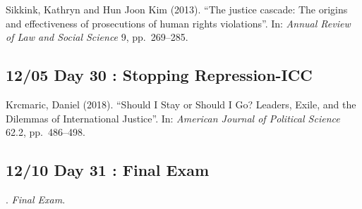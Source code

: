 \documentclass[11pt,]{article}
\begin{document}
Sikkink, Kathryn and Hun Joon Kim (2013). ``The justice cascade: The
origins and effectiveness of prosecutions of human rights violations''.
In: \emph{Annual Review of Law and Social Science} 9, pp.~269--285.

\hypertarget{day-30-stopping-repression-icc}{%
\subsection{12/05 Day 30 : Stopping
Repression-ICC}\label{day-30-stopping-repression-icc}}

Krcmaric, Daniel (2018). ``Should I Stay or Should I Go? Leaders, Exile,
and the Dilemmas of International Justice''. In:
\emph{American Journal of Political Science} 62.2, pp.~486--498.

\hypertarget{day-31-final-exam}{%
\subsection{12/10 Day 31 : Final Exam}\label{day-31-final-exam}}

. \emph{Final Exam}.
\end{document}

